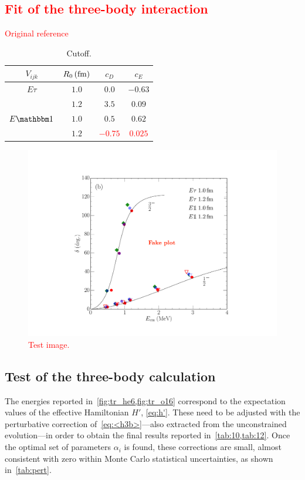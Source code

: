 \documentclass[aps,prc,twocolumn,superscriptaddress,floatfix]{revtex4-1}
\newcommand{\red}[1]{\protect\textcolor{red}{#1}}
\begin{document}
\subsection{\red{Fit of the three-body interaction}}
\red{Original reference}~\cite{Lynn:2016}

\begin{table}[htb]
\centering
\caption[]{Cutoff.}
\begin{tabular}{cccc}
\hline\hline
$V_{ijk}$    & $R_0\,(\rm fm)$ & $c_D$ & $c_E$ \\
\hline
$E\tau$      & $1.0$ & $0.0$   & $-0.63$ \\
             & $1.2$ & $3.5$   & $0.09$  \\
$E\mathbbm1$ & $1.0$ & $0.5$   & $0.62$  \\
             & $1.2$ & \red{$-0.75$} & \red{$0.025$} \\
\hline\hline
\end{tabular}
\label{tab:3bfit}
\end{table}

\begin{figure}[htb]
\includegraphics[width=\linewidth]{nalpha.pdf}
\caption[]{\red{Test image.}}
\label{fig:3bfit}
\end{figure}


\subsection{Test of the three-body calculation}
The energies reported in~\cref{fig:tr_he6,fig:tr_o16} correspond to the
expectation values of the effective Hamiltonian $H'$, \cref{eq:h'}. 
These need to be adjusted with the perturbative correction of~\cref{eq:<h3b>}---also extracted 
from the unconstrained evolution---in order to obtain the final results reported in~\cref{tab:10,tab:12}. 
Once the optimal set of parameters $\alpha_i$ is found, these corrections are small,
almost consistent with zero within Monte Carlo statistical uncertainties,
as shown in~\cref{tab:pert}.
\end{document}
